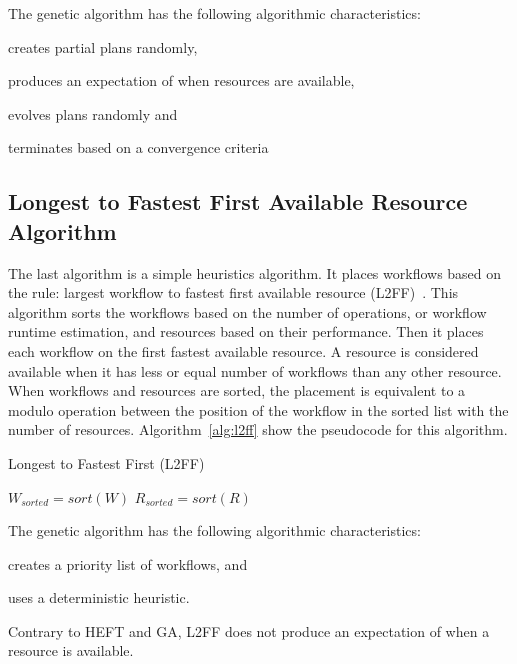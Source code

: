 The genetic algorithm has the following algorithmic characteristics:
\begin{inparaenum}[1)]
    \item creates partial plans randomly,
    \item produces an expectation of when resources are available,
    \item evolves plans randomly and
    \item terminates based on a convergence criteria
\end{inparaenum}


\subsection{Longest to Fastest First Available Resource Algorithm}
\label{algo:l2ff}
The last algorithm is a simple heuristics algorithm.
It places workflows based on the rule: largest workflow to fastest first available resource (L2FF)~\cite{balasubramanian2019programming}.
This algorithm sorts the workflows based on the number of operations, or workflow runtime estimation, and resources based on their performance.
Then it places each workflow on the first fastest available resource.
A resource is considered available when it has less or equal number of workflows than any other resource.
When workflows and resources are sorted, the placement is equivalent to a modulo operation between the position of the workflow in the sorted list with the number of resources.
Algorithm~\ref{alg:l2ff} show the pseudocode for this algorithm.

\begin{algorithm}[ht]
    \caption{Longest to Fastest First (L2FF)}
    \label{alg:l2ff}
    \begin{algorithmic}[1]
        \State \texttt{$W_{sorted}=sort(W)$} 
        \State \texttt{$R_{sorted}=sort(R)$}
        \EndFor
        \EndProcedure
    \end{algorithmic}
\end{algorithm}

The genetic algorithm has the following algorithmic characteristics:
\begin{inparaenum}[1)]
    \item creates a priority list of workflows, and
    \item uses a deterministic heuristic.
\end{inparaenum}
Contrary to HEFT and GA, L2FF does not produce an expectation of when a resource is available.

